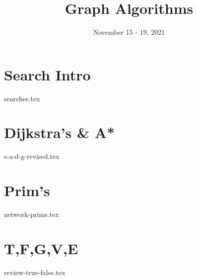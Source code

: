 \documentclass[11pt]{exam}
\title{Graph Algorithms}
\date{November 15 - 19, 2021}
\begin{document}
\maketitle

\section{Search Intro}
\begin{questions}
{searches.tex}
\end{questions}
\pagebreak

\section{Dijkstra's \& A*}
\begin{questions}
{s-a-d-g-revised.tex}

\end{questions}

\pagebreak
\section{Prim's}
\begin{questions}
{network-prims.tex}
\end{questions}
\pagebreak

\vspace{25mm}

\section{T,F,G,V,E}
\begin{questions}
{review-true-false.tex}
\end{questions}

\end{document}
